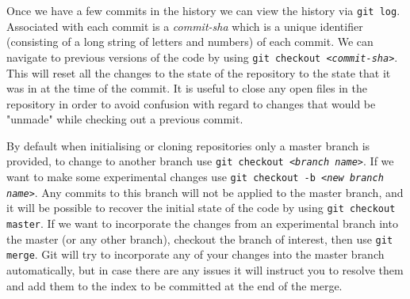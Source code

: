\documentclass{article}
\newcommand{\code}[1]{\texttt{#1}}
\newcommand{\ital}[1]{\textit{#1}}
\begin{document}
Once we have a few commits in the history we can view the history via \code{git log}. Associated with each commit is a \ital{commit-sha} which is a unique identifier (consisting of a long string of letters and numbers) of each commit. We can navigate to previous versions of the code by using \code{git checkout <\ital{commit-sha}>}. This will reset all the changes to the state of the repository to the state that it was in at the time of the commit. It is useful to close any open files in the repository in order to avoid confusion with regard to changes that would be "unmade" while checking out a previous commit. 

By default when initialising or cloning repositories only a master branch is provided, to change to another branch use \code{git checkout <\ital{branch name}>}. If we want to make some experimental changes use \code{git checkout -b <\ital{new branch name}>}. Any commits to this branch will not be applied to the master branch, and it will be possible to recover the initial state of the code by using \code{git checkout master}. If we want to incorporate the changes from an experimental branch into the master (or any other branch), checkout the branch of interest, then use \code{git merge}. Git will try to incorporate any of your changes into the master branch automatically, but in case there are any issues it will instruct you to resolve them and add them to the index to be committed at the end of the merge.
\end{document}
